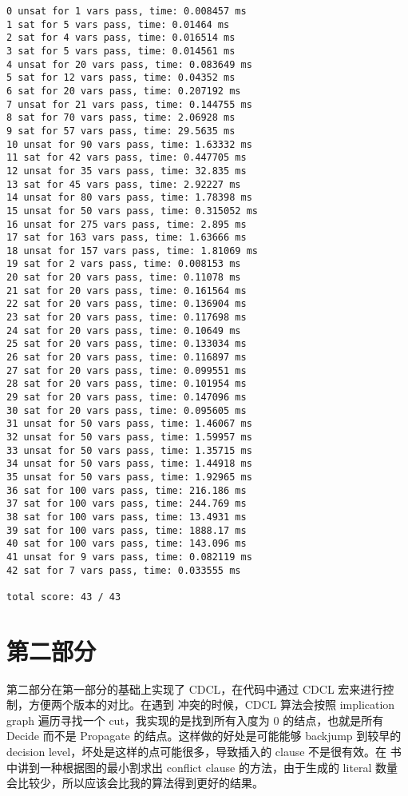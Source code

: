 \documentclass[11pt,a4paper]{ctexart}
\begin{document}
\begin{lstlisting}
0 unsat for 1 vars pass, time: 0.008457 ms
1 sat for 5 vars pass, time: 0.01464 ms
2 sat for 4 vars pass, time: 0.016514 ms
3 sat for 5 vars pass, time: 0.014561 ms
4 unsat for 20 vars pass, time: 0.083649 ms
5 sat for 12 vars pass, time: 0.04352 ms
6 sat for 20 vars pass, time: 0.207192 ms
7 unsat for 21 vars pass, time: 0.144755 ms
8 sat for 70 vars pass, time: 2.06928 ms
9 sat for 57 vars pass, time: 29.5635 ms
10 unsat for 90 vars pass, time: 1.63332 ms
11 sat for 42 vars pass, time: 0.447705 ms
12 unsat for 35 vars pass, time: 32.835 ms
13 sat for 45 vars pass, time: 2.92227 ms
14 unsat for 80 vars pass, time: 1.78398 ms
15 unsat for 50 vars pass, time: 0.315052 ms
16 unsat for 275 vars pass, time: 2.895 ms
17 sat for 163 vars pass, time: 1.63666 ms
18 unsat for 157 vars pass, time: 1.81069 ms
19 sat for 2 vars pass, time: 0.008153 ms
20 sat for 20 vars pass, time: 0.11078 ms
21 sat for 20 vars pass, time: 0.161564 ms
22 sat for 20 vars pass, time: 0.136904 ms
23 sat for 20 vars pass, time: 0.117698 ms
24 sat for 20 vars pass, time: 0.10649 ms
25 sat for 20 vars pass, time: 0.133034 ms
26 sat for 20 vars pass, time: 0.116897 ms
27 sat for 20 vars pass, time: 0.099551 ms
28 sat for 20 vars pass, time: 0.101954 ms
29 sat for 20 vars pass, time: 0.147096 ms
30 sat for 20 vars pass, time: 0.095605 ms
31 unsat for 50 vars pass, time: 1.46067 ms
32 unsat for 50 vars pass, time: 1.59957 ms
33 unsat for 50 vars pass, time: 1.35715 ms
34 unsat for 50 vars pass, time: 1.44918 ms
35 unsat for 50 vars pass, time: 1.92965 ms
36 sat for 100 vars pass, time: 216.186 ms
37 sat for 100 vars pass, time: 244.769 ms
38 sat for 100 vars pass, time: 13.4931 ms
39 sat for 100 vars pass, time: 1888.17 ms
40 sat for 100 vars pass, time: 143.096 ms
41 unsat for 9 vars pass, time: 0.082119 ms
42 sat for 7 vars pass, time: 0.033555 ms

total score: 43 / 43
\end{lstlisting}

\section{第二部分}

第二部分在第一部分的基础上实现了 CDCL，在代码中通过 CDCL 宏来进行控制，方便两个版本的对比。在遇到 冲突的时候，CDCL 算法会按照 implication graph 遍历寻找一个 cut，我实现的是找到所有入度为 0 的结点，也就是所有 Decide 而不是 Propagate 的结点。这样做的好处是可能能够 backjump 到较早的 decision level，坏处是这样的点可能很多，导致插入的 clause 不是很有效。在 \cite{kroening_decision_2008} 书中讲到一种根据图的最小割求出 conflict clause 的方法，由于生成的 literal 数量会比较少，所以应该会比我的算法得到更好的结果。
\end{document}

